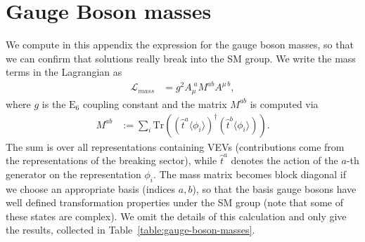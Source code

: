 \documentclass[a4paper,12pt]{article}
\def\EE{\mathrm{E}_6}
\begin{document}
\appendix
\section{Gauge Boson masses \label{Gauge-Boson-masses}}
We compute in this appendix the expression for the gauge boson masses, so that we can confirm that solutions really break into the SM group. We write the mass terms in the Lagrangian as
\begin{align}
\mathcal{L}_{mass}&=g^2 A_\mu^{\;a} M^{ab} A^{\mu\,b},
\end{align}
\noindent
where $g$ is the $\EE$ coupling constant and the matrix $M^{ab}$ is computed via
\begin{align}
M^{ab}&:=\sum_i\mathrm{Tr}\left(\left(\hat{t}^{a} \langle\phi_i\rangle\right)^\dagger \left(\hat{t}^{b} \langle\phi_i\rangle\right)\right).
\end{align}
\noindent
The sum is over all representations containing VEVs (contributions come from the representations of the breaking sector), while $\hat{t}^a$ denotes the action of the $a$-th generator on the representation $\phi_i$. The mass matrix becomes block diagonal if we choose an appropriate basis (indices $a,b$), so that the basis gauge bosons have well defined transformation properties under the SM group (note that some of these states are complex). We omit the details of this calculation and only give the results, collected in Table~\ref{table:gauge-boson-masses}.
\end{document}
